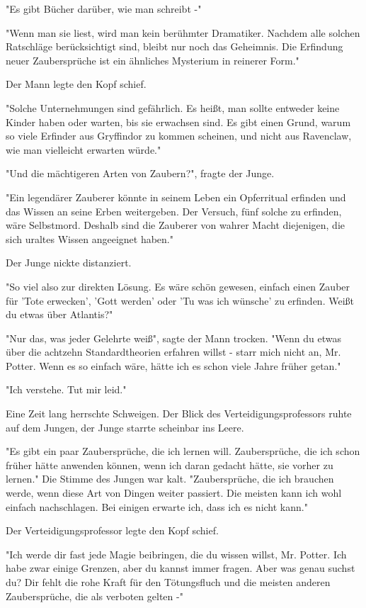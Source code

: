 {"Es gibt Bücher darüber, wie man schreibt -"

"Wenn man sie liest, wird man kein berühmter Dramatiker. Nachdem alle solchen Ratschläge berücksichtigt sind, bleibt nur noch das Geheimnis. Die Erfindung neuer Zaubersprüche ist ein ähnliches Mysterium in reinerer Form."

Der Mann legte den Kopf schief.

"Solche Unternehmungen sind gefährlich. Es heißt, man sollte entweder keine Kinder haben oder warten, bis sie erwachsen sind. Es gibt einen Grund, warum so viele Erfinder aus Gryffindor zu kommen scheinen, und nicht aus Ravenclaw, wie man vielleicht erwarten würde."

"Und die mächtigeren Arten von Zaubern?", fragte der Junge.

"Ein legendärer Zauberer könnte in seinem Leben ein Opferritual erfinden und das Wissen an seine Erben weitergeben. Der Versuch, fünf solche zu erfinden, wäre Selbstmord. Deshalb sind die Zauberer von wahrer Macht diejenigen, die sich uraltes Wissen angeeignet haben."

Der Junge nickte distanziert.

"So viel also zur direkten Lösung. Es wäre schön gewesen, einfach einen Zauber für 'Tote erwecken', 'Gott werden' oder 'Tu was ich wünsche' zu erfinden. Weißt du etwas über Atlantis?"

"Nur das, was jeder Gelehrte weiß", sagte der Mann trocken. "Wenn du etwas über die achtzehn Standardtheorien erfahren willst - starr mich nicht an, Mr. Potter. Wenn es so einfach wäre, hätte ich es schon viele Jahre früher getan."

"Ich verstehe. Tut mir leid."

Eine Zeit lang herrschte Schweigen. Der Blick des Verteidigungsprofessors ruhte auf dem Jungen, der Junge starrte scheinbar ins Leere.

"Es gibt ein paar Zaubersprüche, die ich lernen will. Zaubersprüche, die ich schon früher hätte anwenden können, wenn ich daran gedacht hätte, sie vorher zu lernen." Die Stimme des Jungen war kalt. "Zaubersprüche, die ich brauchen werde, wenn diese Art von Dingen weiter passiert. Die meisten kann ich wohl einfach nachschlagen. Bei einigen erwarte ich, dass ich es nicht kann."

Der Verteidigungsprofessor legte den Kopf schief.

"Ich werde dir fast jede Magie beibringen, die du wissen willst, Mr. Potter. Ich habe zwar einige Grenzen, aber du kannst immer fragen. Aber was genau suchst du? Dir fehlt die rohe Kraft für den Tötungsfluch und die meisten anderen Zaubersprüche, die als verboten gelten -"

}
